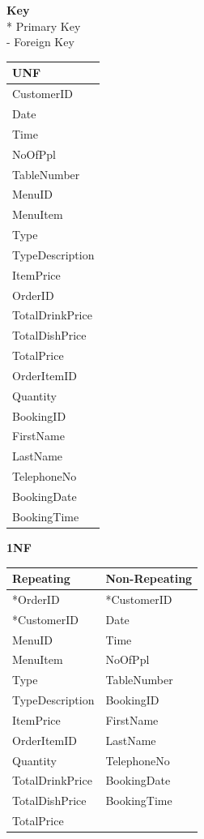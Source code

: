 \begin{center}
\textbf{Key} 
\\
*  Primary Key \\
- Foreign Key
\\
\end{center}


\begin{center}
\begin{tabular}{ | l |   }
    \hline
    \textbf{UNF} \\ \hline
	CustomerID \\
	Date \\
	Time \\
	NoOfPpl \\
	TableNumber \\
	MenuID \\
	MenuItem \\
	Type \\
	TypeDescription \\
	ItemPrice \\
	OrderID \\
	TotalDrinkPrice \\
	TotalDishPrice \\
	TotalPrice \\
	OrderItemID \\
	Quantity \\
	BookingID \\
	FirstName \\
	LastName \\
	TelephoneNo \\
	BookingDate \\
	BookingTime \\

     \hline
\end{tabular}
\label{tab:UnF}
\end{center}



\begin{center}
\textbf{1NF} \\
\begin{tabular}{ | l | l |   }
    \hline
    \textbf{Repeating} & \textbf{Non-Repeating} \\ \hline
	 *OrderID& *CustomerID\\
	*CustomerID & Date\\
	MenuID & Time\\	
	MenuItem & NoOfPpl\\
	Type & TableNumber\\
	 TypeDescription & BookingID\\
	ItemPrice &FirstName\\
	OrderItemID&LastName\\
	Quantity&TelephoneNo\\
	TotalDrinkPrice& BookingDate\\
	TotalDishPrice& BookingTime \\
	TotalPrice& \\
	
     \hline
\end{tabular}
\label{tab:1nF}
\end{center}

